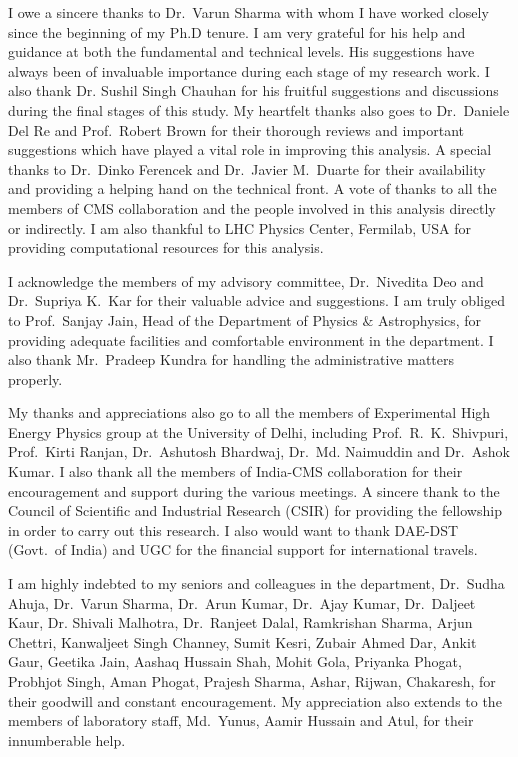 I owe a sincere thanks to Dr.\ Varun Sharma with whom I have worked closely since the beginning of my Ph.D tenure. I am very grateful for his help and guidance
at both the fundamental and technical levels. His suggestions have always been of invaluable importance during each stage of my research work.   
I also thank Dr. Sushil Singh Chauhan for his fruitful suggestions and discussions during the final stages of this study.
My heartfelt thanks also goes to Dr.\ Daniele Del Re and Prof.\ Robert Brown for their thorough reviews and important suggestions which have played a vital role
in improving this analysis. A special thanks to Dr.\ Dinko Ferencek and Dr.\ Javier M.\ Duarte for their availability and providing a helping hand on the technical front.
A vote of thanks to all the members of CMS collaboration and the people involved in this analysis directly or indirectly.
I am also thankful to LHC Physics Center, Fermilab, USA for providing computational resources for this analysis.

I acknowledge the members of my advisory committee, Dr.\ Nivedita Deo and Dr.\ Supriya K.\ Kar for their valuable advice and suggestions.
I am truly obliged to Prof.\ Sanjay Jain, Head of the Department of Physics $\&$ Astrophysics, for providing adequate facilities and comfortable environment
in the department. I also thank Mr.\ Pradeep Kundra for handling the administrative matters properly.

My thanks and appreciations also go to all the members of Experimental High Energy Physics group at the University of Delhi, including
Prof.\ R.\ K.\ Shivpuri, Prof.\ Kirti Ranjan, Dr.\ Ashutosh Bhardwaj, Dr.\ Md. Naimuddin and Dr.\ Ashok Kumar.
I also thank all the members of India-CMS collaboration for their encouragement and support during the various meetings.  
A sincere thank to the Council of Scientific and Industrial Research (CSIR) for providing the fellowship in order to carry out this research. I also 
would want to thank DAE-DST (Govt.\ of India) and UGC for the financial support for international travels. 

I am highly indebted to my seniors and colleagues in the department, Dr.\ Sudha Ahuja, Dr.\ Varun Sharma, Dr.\ Arun Kumar, Dr.\ Ajay Kumar,
Dr.\ Daljeet Kaur, Dr. Shivali Malhotra, Dr.\ Ranjeet Dalal, Ramkrishan Sharma, Arjun Chettri, Kanwaljeet Singh Channey, Sumit Kesri, Zubair Ahmed Dar,
Ankit Gaur, Geetika Jain, Aashaq Hussain Shah, Mohit Gola, Priyanka Phogat, Probhjot Singh, Aman Phogat, Prajesh Sharma, Ashar, Rijwan, Chakaresh,
for their goodwill and constant encouragement. My appreciation also extends to the members of laboratory staff, Md.\ Yunus, Aamir Hussain and Atul, for
their innumberable help. 
 
